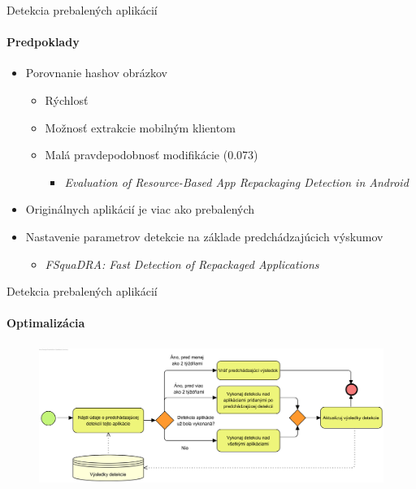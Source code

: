 \documentclass{beamer}
\begin{document}
 \begin{frame}[label=lists]{Detekcia prebalených aplikácií}
 	 \framesubtitle{Predpoklady}
		\begin{itemize}
			\item Porovnanie hashov obrázkov
			\begin{itemize}
				\item Rýchlosť
				\item Možnosť extrakcie mobilným klientom
				\item Malá pravdepodobnosť modifikácie (0.073) \cite{a}				
				\begin{itemize}
					\item \textit{Evaluation of Resource-Based App Repackaging Detection in Android}
				\end{itemize}
			\end{itemize}
			\item Originálnych aplikácií je viac ako prebalených
			\item Nastavenie parametrov detekcie na základe predchádzajúcich výskumov \cite{b}	
				\begin{itemize}
					\item \textit{FSquaDRA: Fast Detection of Repackaged Applications}
					\end{itemize}
		\end{itemize}
  \end{frame}     
  
   \begin{frame}[label=lists]{Detekcia prebalených aplikácií}
 	 \framesubtitle{Optimalizácia}
		\begin{figure}[htb]
	  	\begin{center}
    		\includegraphics[height=4.5cm]{images/detection-optimalization.png}
  		\end{center}
	\end{figure}
  \end{frame}      
  
\end{document}
